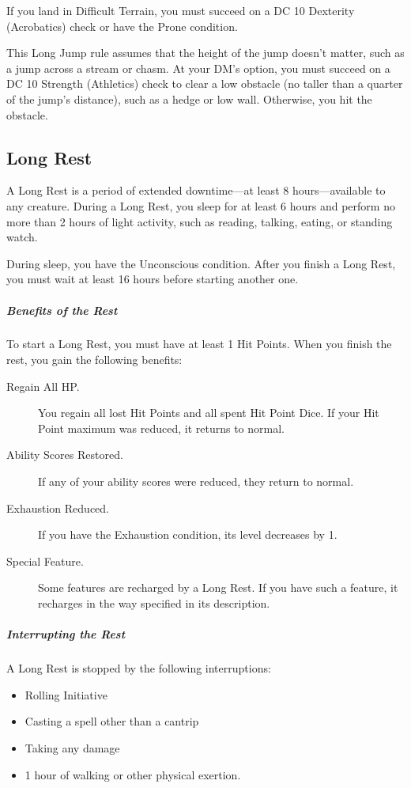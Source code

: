 \documentclass[10pt,a4paper,twoside,bg=print,twocolumn,openany,nodeprecatedcode]{dndarticle}
\begin{document}
If you land in Difficult Terrain, you must succeed on a DC 10 Dexterity (Acrobatics) check or have the Prone condition.

This Long Jump rule assumes that the height of the jump doesn't matter, such as a jump across a stream or chasm. At your DM's option, you must succeed on a DC 10 Strength (Athletics) check to clear a low obstacle (no taller than a quarter of the jump's distance), such as a hedge or low wall. Otherwise, you hit the obstacle.

\subsection{Long Rest}
A Long Rest is a period of extended downtime—at least 8 hours—available to any creature. During a Long Rest, you sleep for at least 6 hours and perform no more than 2 hours of light activity, such as reading, talking, eating, or standing watch.

During sleep, you have the Unconscious condition. After you finish a Long Rest, you must wait at least 16 hours before starting another one.

\subparagraph{Benefits of the Rest}
To start a Long Rest, you must have at least 1 Hit Points. When you finish the rest, you gain the following benefits:


\begin{description}
\item[Regain All HP.]
You regain all lost Hit Points and all spent Hit Point Dice. If your Hit Point maximum was reduced, it returns to normal.

\item[Ability Scores Restored.]
If any of your ability scores were reduced, they return to normal.

\item[Exhaustion Reduced.]
If you have the Exhaustion condition, its level decreases by 1.

\item[Special Feature.]
Some features are recharged by a Long Rest. If you have such a feature, it recharges in the way specified in its description.

\end{description}

\subparagraph{Interrupting the Rest}
A Long Rest is stopped by the following interruptions:


\begin{itemize}
\item Rolling Initiative
\item Casting a spell other than a cantrip
\item Taking any damage
\item 1 hour of walking or other physical exertion.
\end{itemize}
\end{document}
